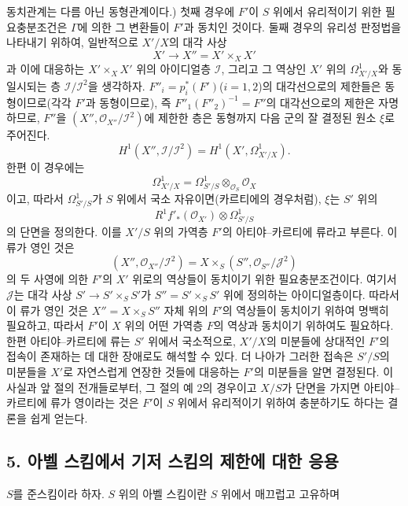 동치관계는 다름 아닌 동형관계이다.) 첫째 경우에 $F'$이 $S$ 위에서
유리적이기 위한 필요충분조건은 $\Gamma$에 의한 그 변환들이 $F'$과
동치인 것이다. 둘째 경우의 유리성 판정법을 나타내기 위하여, 일반적으로
$X'/X$의 대각 사상
\[
  X'\longrightarrow X''=X'\times_XX'
\]
과 이에 대응하는 $X'\times_XX'$ 위의 아이디얼층 $\mathcal I$, 그리고
그 역상인 $X'$ 위의 $\Omega^1_{X'/X}$와 동일시되는 층
$\mathcal I/\mathcal I^2$을 생각하자. $F''_i=p_i^*(F')$($i=1,2$)의
대각선으로의 제한들은 동형이므로(각각 $F'$과 동형이므로), 즉
$F''_1(F''_2)^{-1}=F''$의 대각선으로의 제한은 자명하므로, $F''$을
$(X'',\mathcal O_{X''}/\mathcal I^2)$에 제한한 층은 동형까지 다음 군의
잘 결정된 원소 $\xi$로 주어진다.
\[
  H^1(X'',\mathcal I/\mathcal I^2)
  =H^1(X',\Omega^1_{X'/X}).
\]
한편 이 경우에는
\[
  \Omega^1_{X'/X}
  =\Omega^1_{S'/S}\otimes_{\mathcal O_S}\mathcal O_X
\]
이고, 따라서 $\Omega^1_{S'/S}$가 $S$ 위에서 국소 자유이면(카르티에의
경우처럼), $\xi$는 $S'$ 위의
\[
  R^1f'_*(\mathcal O_{X'})\otimes\Omega^1_{S'/S}
\]
의 단면을 정의한다. 이를 $X'/S$ 위의 가역층 $F'$의
아티야--카르티에 류라고 부른다. 이 류가 영인 것은
\[
  (X'',\mathcal O_{X''}/\mathcal I^2)
  =X\times_S(S'',\mathcal O_{S''}/\mathcal J^2)
\]
의 두 사영에 의한 $F'$의 $X'$ 위로의 역상들이 동치이기 위한
필요충분조건이다. 여기서 $\mathcal J$는 대각 사상
$S'\longrightarrow S'\times_SS'$가 $S''=S'\times_SS'$ 위에 정의하는
아이디얼층이다. 따라서 이 류가 영인 것은 $X''=X\times_SS''$ 자체 위의
$F'$의 역상들이 동치이기 위하여 명백히 필요하고, 따라서 $F'$이 $X$ 위의
어떤 가역층 $F$의 역상과 동치이기 위하여도 필요하다. 한편
아티야--카르티에 류는 $S'$ 위에서 국소적으로, $X'/X$의 미분들에
상대적인 $F'$의 접속이 존재하는 데 대한 장애로도 해석할 수 있다. 더
나아가 그러한 접속은 $S'/S$의 미분들을 $X'$로 자연스럽게 연장한 것들에
대응하는 $F'$의 미분들을 알면 결정된다. 이 사실과 앞 절의 전개들로부터,
그 절의 예 2의 경우이고 $X/S$가 단면을 가지면 아티야--카르티에 류가
영이라는 것은 $F'$이 $S$ 위에서 유리적이기 위하여 충분하기도 하다는
결론을 쉽게 얻는다.

\subsection*{5. 아벨 스킴에서 기저 스킴의 제한에 대한 응용}

$S$를 준스킴이라 하자. $S$ 위의 아벨 스킴이란 $S$ 위에서 매끄럽고
고유하며

